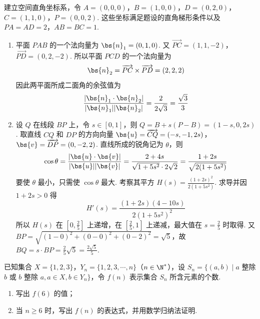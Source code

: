 \begin{solution}
建立空间直角坐标系，令
 \(A=(0,0,0)\)，\(B=(1,0,0)\)，\(D=(0,2,0)\)，\(C=(1,1,0)\)，\(P=(0,0,2)\).
这些坐标满足题设的直角梯形条件以及 \(PA=AD=2\)，\(AB=BC=1\).

\begin{enumerate}
\item 平面 \(PAB\) 的一个法向量为 \(\bs{n}_1=(0,1,0)\). 又 \(\overrightarrow{PC}=(1,1,-2)\)，\(\overrightarrow{PD}=(0,2,-2)\).
所以平面 \(PCD\) 的一个法向量为
\[
\bs{n}_2=\overrightarrow{PC}\times\overrightarrow{PD}=(2,2,2)
\]
因此两平面所成二面角的余弦值为
\[
\frac{\left|\bs{n}_1\cdot\bs{n}_2\right|}{|\bs{n}_1||\bs{n}_2|}
=\frac{2}{2\sqrt3}=\frac{\sqrt3}{3}
\]

\item 设 \(Q\) 在线段 \(BP\) 上，令 \(s\in[0,1]\)，则 \(Q=B+s(P-B)=(1-s,0,2s)\).
取直线 \(CQ\) 和 \(DP\) 的方向向量 \(\bs{u}=\overrightarrow{CQ}=(-s,-1,2s)\)，\(\bs{v}=\overrightarrow{DP}=(0,-2,2)\).
直线所成的锐角记为 \(\theta\)，则
\[
\cos\theta=\frac{|\bs{u}\cdot\bs{v}|}{|\bs{u}||\bs{v}|}
=\frac{2+4s}{\sqrt{1+5s^2}\cdot2\sqrt2}
=\frac{1+2s}{\sqrt{2(1+5s^2)}}
\]
要使 \(\theta\) 最小，只需使 \(\cos\theta\) 最大. 考察其平方 \(H(s)=\frac{(1+2s)^2}{2(1+5s^2)}\).
求导并因 \(1+2s>0\) 得
\[
H'(s)=\frac{(1+2s)(4-10s)}{2(1+5s^2)^2}
\]
所以 \(H(s)\) 在 \(\left[0,\frac25\right]\) 上递增，在 \(\left[\frac25,1\right]\) 上递减，最大值在 \(s=\frac25\) 时取得. 又 \(BP=\sqrt{(1-0)^2+(0-0)^2+(0-2)^2}=\sqrt5\)，故 \(BQ=s\cdot BP=\frac25\sqrt5=\frac{2\sqrt5}{5}\).
\end{enumerate}
\end{solution}

\begin{problem}
已知集合 \(X = \{1, 2, 3\}\)，\(Y_n = \{1, 2, 3, \cdots, n\}\)（\(n \in \N^*\)），设 \(S_n = \{(a, b) \mid a\) 整除 \(b\) 或 \(b\) 整除 \(a, a \in X, b \in Y_n\}\)，令 \(f(n)\) 表示集合 \(S_n\) 所含元素的个数.
\begin{enumerate}
\item 写出 \(f(6)\) 的值；
\item 当 \(n \geqslant 6\) 时，写出 \(f(n)\) 的表达式，并用数学归纳法证明.
\end{enumerate}
\end{problem}

